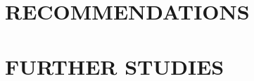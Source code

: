 \documentclass[12pt,a4paper]{report}
\begin{document}
\section{RECOMMENDATIONS}
\lipsum[7-8]
\section{FURTHER STUDIES}
\lipsum[1]

\newpage
{}

 


\end{document}
